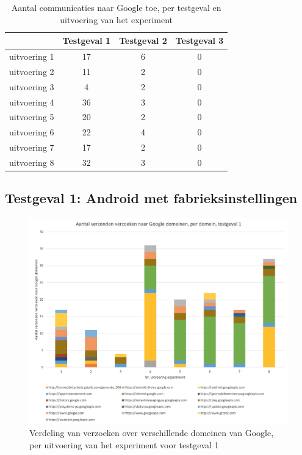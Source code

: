 \begin{table}[h]
    \centering
    \begin{tabular}{@{}rccc@{}}
        \toprule
        \multicolumn{1}{l}{} & Testgeval 1 & Testgeval 2 & Testgeval 3 \\ \midrule
        uitvoering 1 & 17 & 6 & 0 \\
        uitvoering 2 & 11 & 2 & 0 \\
        uitvoering 3 & 4 & 2 & 0 \\
        uitvoering 4 & 36 & 3 & 0 \\
        uitvoering 5 & 20 & 2 & 0 \\
        uitvoering 6 & 22 & 4 & 0 \\
        uitvoering 7 & 17 & 2 & 0 \\
        uitvoering 8 & 32 & 3 & 0 \\ \bottomrule
    \end{tabular}
    \caption{Aantal communicaties naar Google toe, per testgeval en uitvoering van het experiment}
    \label{tab:resumed}
\end{table}
\subsection{Testgeval 1: Android met fabrieksinstellingen}

\begin{figure}
    \centering
    \includegraphics[width=1\textwidth]{experiment/grafieken/stackedbars-testgeval1.png}
    \caption{Verdeling van verzoeken over verschillende domeinen van Google, per uitvoering van het experiment voor testgeval 1}
    \label{fig:stackedbars-testgeval1}
\end{figure}

